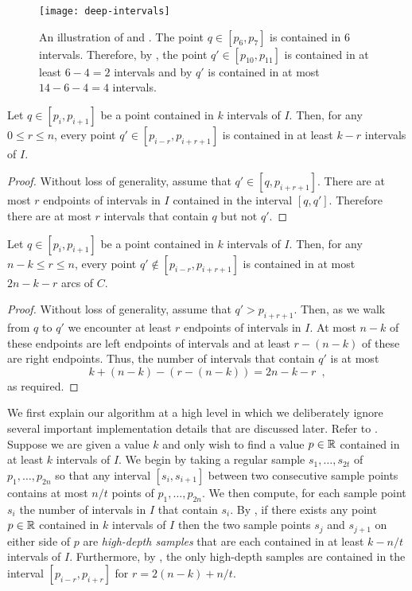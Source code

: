 \documentclass[12pt]{article}
\begin{document}
\begin{figure}
\begin{center}
\texttt{[image: deep-intervals]}
\end{center}
\caption{An illustration of  and .  The point $q\in
[p_6,p_7]$ is contained in 6 intervals.  Therefore, by , the point $q'\in
[p_{10},p_{11}]$ is contained in at least $6-4 = 2$ intervals and by
 $q'$ is contained in at most $14-6-4=4$ intervals.}
\end{figure}

\begin{lem}
Let $q\in[p_i,p_{i+1}]$ be a point contained in $k$ intervals of $I$.
Then, for any $0\le r\le n$, every point $q'\in[p_{i-r},p_{i+r+1}]$ is
contained in at least $k-r$ intervals of $I$.
\end{lem}

\begin{proof}
Without loss of generality, assume that $q'\in[q,p_{i+r+1}]$.  There are
at most $r$ endpoints of intervals in $I$ contained in the interval
$[q,q']$.  Therefore there are at most $r$ intervals that contain $q$
but not $q'$.
\end{proof}

\begin{lem}
Let $q\in[p_i,p_{i+1}]$ be a point contained in $k$ intervals of $I$.
Then, for any $n-k \le r\le n$, every point $q'\notin[p_{i-r},p_{i+r+1}]$ 
is contained in at most $2n-k-r$ arcs of $C$.
\end{lem}

\begin{proof}
Without loss of generality, assume that $q'> p_{i+r+1}$.  Then, as we
walk from $q$ to $q'$ we encounter at least $r$ endpoints of intervals
in $I$.  At most $n-k$ of these endpoints are left endpoints of
intervals and at least $r-(n-k)$ of these are right endpoints.  Thus,
the number of intervals that contain $q'$ is at most
\[
      k + (n-k) - (r-(n-k)) = 2n - k - r \enspace ,
\]
as required.
\end{proof}

We first explain our algorithm at a high level in which we
deliberately ignore several important implementation details that are
discussed later.  Refer to . Suppose we are given
a value $k$ and only wish to find a value $p\in\mathbb{R}$ contained in at
least $k$ intervals of $I$.  We begin by taking a regular sample
$s_1,\ldots,s_{2t}$ of $p_1,\ldots,p_{2n}$ so that any interval
$[s_i,s_{i+1}]$ between two consecutive sample points contains at most
$n/t$ points of $p_1,\ldots,p_{2n}$.  We then compute, for each sample
point $s_i$ the number of intervals in $I$ that contain $s_i$.  By
, if there exists any point $p\in \mathbb{R}$ contained in $k$
intervals of $I$ then the two sample points $s_j$ and $s_{j+1}$ on
either side of $p$ are \emph{high-depth samples} that are each
contained in at least $k-n/t$ intervals of $I$.  Furthermore, by
, the only high-depth samples are contained in the
interval $[p_{i-r},p_{i+r}]$ for $r=2(n-k)+n/t$.  
\end{document}
